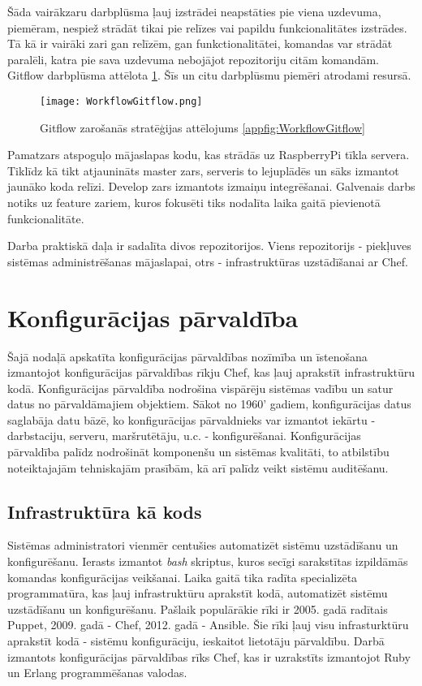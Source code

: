 Šāda vairākzaru darbplūsma ļauj izstrādei neapstāties pie viena uzdevuma, piemēram, nespiež strādāt tikai pie relīzes vai papildu funkcionalitātes izstrādes. Tā kā ir vairāki zari gan relīzēm, gan funkctionalitātei, komandas var strādāt paralēli, katra pie sava uzdevuma nebojājot repozitoriju citām komandām.
Gitflow darbplūsma attēlota \ref{fig:WorkflowGitflow}. Šīs un citu darbplūsmu piemēri atrodami \cite[Gitflow Workflow]{workflow-comparison} resursā.
\begin{figure}[H]%
	\centering
	\captionsetup{justification=centering}
	\texttt{[image: WorkflowGitflow.png]}
	\caption{Gitflow zarošanās stratēģijas attēlojums \ref{appfig:WorkflowGitflow}}
	\label{fig:WorkflowGitflow}
\end{figure}
Pamatzars atspoguļo mājaslapas kodu, kas strādās uz RaspberryPi tīkla servera. Tiklīdz kā tikt atjaunināts master zars, serveris to lejuplādēs un sāks izmantot jaunāko koda relīzi.
Develop zars izmantots izmaiņu integrēšanai.
Galvenais darbs notiks uz feature zariem, kuros fokusēti tiks nodalīta laika gaitā pievienotā funkcionalitāte.



Darba praktiskā daļa ir sadalīta divos repozitorijos. Viens repozitorijs - piekļuves sistēmas administrēšanas mājaslapai, otrs - infrastruktūras uzstādīšanai ar Chef.

\chapter{Konfigurācijas pārvaldība}
Šajā nodaļā apskatīta konfigurācijas pārvaldības nozīmība un īstenošana izmantojot konfigurācijas pārvaldības rīkju Chef, kas ļauj aprakstīt infrastruktūru kodā.
Konfigurācijas pārvaldība nodrošina vispārēju sistēmas vadību un satur datus no pārvaldāmajiem objektiem. Sākot no 1960' gadiem, konfigurācijas datus saglabāja datu bāzē, ko konfigurācijas pārvaldnieks var izmantot iekārtu - darbstaciju, serveru, maršrutētāju, u.c. - konfigurēšanai.
Konfigurācijas pārvaldība palīdz nodrošināt komponenšu un sistēmas kvalitāti, to atbilstību noteiktajajām tehniskajām prasībām, kā arī palīdz veikt sistēmu auditēšanu.

\section{Infrastruktūra kā kods}
Sistēmas administratori vienmēr centušies automatizēt sistēmu uzstādīšanu un konfigurēšanu. Ierasts izmantot \textit{bash} skriptus, kuros secīgi sarakstītas izpildāmās komandas konfigurācijas veikšanai. Laika gaitā tika radīta specializēta programmatūra, kas ļauj infrastruktūru aprakstīt kodā, automatizēt sistēmu uzstādīšanu un konfigurēšanu. Pašlaik populārākie rīki ir 2005. gadā radītais Puppet, 2009. gadā - Chef, 2012. gadā - Ansible. Šie rīki ļauj visu infrasturktūru aprakstīt kodā - sistēmu konfigurāciju, ieskaitot lietotāju pārvaldību. Darbā izmantots konfigurācijas pārvaldības rīks Chef, kas ir uzrakstīts izmantojot Ruby un Erlang programmēšanas valodas.

